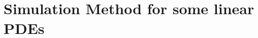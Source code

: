 \documentclass{article}
\newcommand{\dd}{\mathrm{d}}
\begin{document}










\section{Simulation Method for some linear PDEs}











\end{document}
